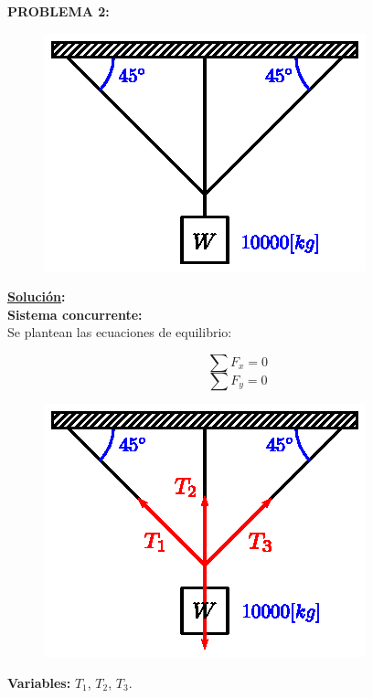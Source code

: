 \documentclass[letter,10pt,twoside]{article}
\begin{document}
\vspace{1.0cm}

\colorbox{blue!25}{\textbf{PROBLEMA 2:}}

\begin{figure}[H]
\centering
\includegraphics[scale=1.3]{resources/f02.eps}
\end{figure}

\textbf{\underline{Solución}:} \\

\textbf{Sistema concurrente:} \\
Se plantean las ecuaciones de equilibrio:

\begin{equation*}
    \sum{F_x} = 0
\end{equation*}
\begin{equation*}
    \sum{F_y} = 0
\end{equation*}

\begin{figure}[H]
\centering
\includegraphics[scale=1.3]{resources/g02.eps}
\end{figure}

\textbf{Variables:} $T_1$, $T_2$, $T_3$.
\\
\end{document}
